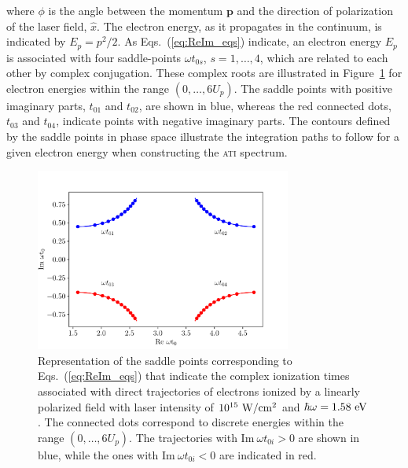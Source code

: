 %
where $\phi$ is the angle between the momentum $\mathbf{p}$ and the
direction of polarization of the laser field, $\hat{x}$. The electron
energy, as it propagates in the continuum, is indicated by $E_{p} =
p^{2}/2$. As Eqs.~(\ref{eq:ReIm_eqs}) indicate, an electron energy
$E_{p}$ is associated with four saddle-points $\omega t_{0s}$, $s = 1,
\dots, 4$, which are related to each other by complex conjugation.
These complex roots are illustrated in Figure~\ref{fig:sp_direct} for
electron energies within the range $(0, \dots, 6U_{p})$. The saddle
points with positive imaginary parts, $t_{01}$ and $t_{02}$, are shown
in blue, whereas the red connected dots, $t_{03}$ and $t_{04}$,
indicate points with negative imaginary parts. The contours defined by
the saddle points in phase space illustrate the integration paths to
follow for a given electron energy when constructing the \textsc{ati}
spectrum.

\begin{figure}
  \centering
  \includegraphics[width = 0.75\textwidth]{figures/ch_ATI_SPA/direct/spDirectElectrons}
  \caption{Representation of the saddle points corresponding to
    Eqs.~(\ref{eq:ReIm_eqs}) that indicate the complex ionization
    times associated with direct trajectories of electrons ionized by
    a linearly polarized field with laser intensity of
    $10^{15}\ \rm{W/cm^{2}}$ and $\hbar\omega = 1.58\ \rm{eV}$. The
    connected dots correspond to discrete energies within the range
    $(0, \dots, 6 U_{p})$. The trajectories with $\mathrm{Im}\ \omega
    t_{0i} > 0$ are shown in blue, while the ones with
    $\mathrm{Im}\ \omega t_{0i} < 0$ are indicated in red.}
  \label{fig:sp_direct}
\end{figure}

